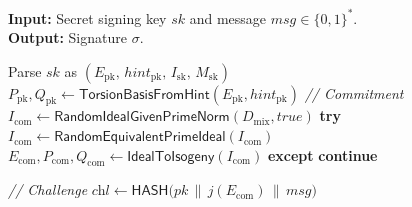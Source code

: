 \begin{algorithm}[!t]
\footnotesize
\caption{Sign($sk, msg$)}\label{alg:Sign}

\textbf{Input:}  Secret signing key $sk$ and message $msg\in\{0,1\}^*$.\\
\textbf{Output:} Signature $\sigma$.
\begin{algorithmic}[1]
\State Parse $sk$ as $(E_{\mathrm{pk}},\, \mathit{hint}_{\mathrm{pk}},\, I_{\mathrm{sk}},\, M_{\mathrm{sk}})$
\State $P_{\mathrm{pk}},Q_{\mathrm{pk}} \gets \textsf{TorsionBasisFromHint}(E_{\mathrm{pk}}, \mathit{hint}_{\mathrm{pk}})$
  \Statex \hspace{\algorithmicindent}\textit{// Commitment}
  \State $I_{\mathrm{com}} \gets \textsf{RandomIdealGivenPrimeNorm}(D_{\mathrm{mix}}, \textit{true})$
  \State \textbf{try}
  \State \quad $I_{\mathrm{com}} \gets \textsf{RandomEquivalentPrimeIdeal}(I_{\mathrm{com}})$
  \State \quad $E_{\mathrm{com}}, P_{\mathrm{com}}, Q_{\mathrm{com}} \gets \textsf{IdealToIsogeny}(I_{\mathrm{com}})$
  \State \textbf{except}
  \State \quad \textbf{continue}

  \Statex \hspace{\algorithmicindent}\textit{// Challenge}
  \State $\textit{chl} \gets \textsf{HASH}\big(pk \,\|\, j(E_{\mathrm{com}}) \,\|\, msg\big)$


\end{algorithmic}
\end{algorithm}
